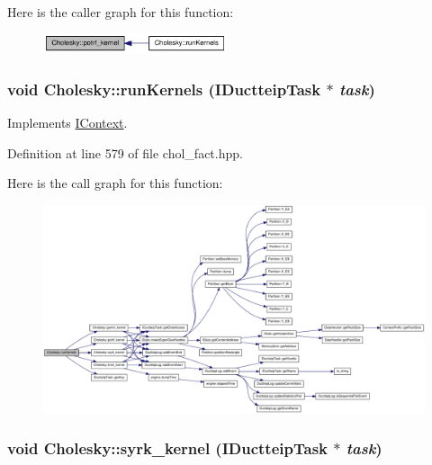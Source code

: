 Here is the caller graph for this function:\nopagebreak
\begin{figure}[H]
\begin{center}
\leavevmode
\includegraphics[width=153pt]{class_cholesky_a603fc15661c381e10c8f1fc535ec48e5_icgraph}
\end{center}
\end{figure}
\hypertarget{class_cholesky_ab025e03f8a91169e1945602f0020b61e}{
\subsubsection[{runKernels}]{\setlength{\rightskip}{0pt plus 5cm}void Cholesky::runKernels ({\bf IDuctteipTask} $\ast$ {\em task})}}
\label{class_cholesky_ab025e03f8a91169e1945602f0020b61e}


Implements \hyperlink{class_i_context_a7e432ff03dfc96f39e8343b28f17fb74}{IContext}.

Definition at line 579 of file chol\_\-fact.hpp.

Here is the call graph for this function:\nopagebreak
\begin{figure}[H]
\begin{center}
\leavevmode
\includegraphics[width=420pt]{class_cholesky_ab025e03f8a91169e1945602f0020b61e_cgraph}
\end{center}
\end{figure}
\hypertarget{class_cholesky_aa448c6006ef1b072de230dc5427372e9}{
\subsubsection[{syrk\_\-kernel}]{\setlength{\rightskip}{0pt plus 5cm}void Cholesky::syrk\_\-kernel ({\bf IDuctteipTask} $\ast$ {\em task})}}
\label{class_cholesky_aa448c6006ef1b072de230dc5427372e9}


